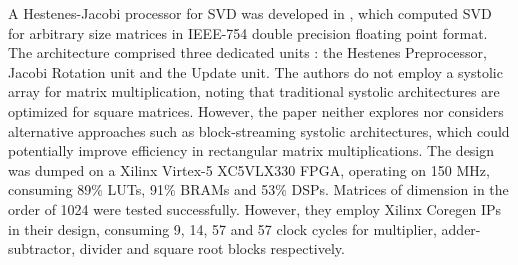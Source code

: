 A Hestenes-Jacobi processor for SVD was developed in \cite{svd_architecture-6}, which computed SVD for arbitrary size matrices in IEEE-754 double precision floating point format. The architecture comprised three dedicated units : the Hestenes Preprocessor, Jacobi Rotation unit and the Update unit. The authors do not employ a systolic array for matrix multiplication, noting that traditional systolic architectures are optimized for square matrices. However, the paper neither explores nor considers alternative approaches such as block-streaming systolic architectures, which could potentially improve efficiency in rectangular matrix multiplications. The design was dumped on a Xilinx Virtex-5 XC5VLX330 FPGA, operating on 150 MHz, consuming 89\% LUTs, 91\% BRAMs and 53\% DSPs. Matrices of dimension in the order of 1024 were tested successfully. However, they employ Xilinx Coregen IPs in their design, consuming 9, 14, 57 and 57 clock cycles for multiplier, adder-subtractor, divider and square root blocks respectively. 


